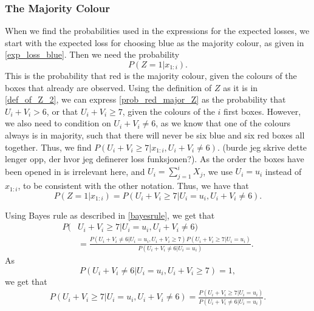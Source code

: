 \subsubsection{The Majority Colour}
When we find the probabilities used in the expressions for the expected losses, we start with the expected loss for choosing blue as the majority colour, as given in \eqref{exp_loss_blue}. Then we need the probability
\begin{equation}
\label{prob_red_major_Z}
    P(Z=1|x_{1:i}).
\end{equation}
This is the probability that red is the majority colour, given the colours of the boxes that already are observed. Using the definition of $Z$ as it is in \eqref{def_of_Z_2}, we can express \eqref{prob_red_major_Z} as the probability that $U_i+V_i>6$, or that $U_i+V_i \geq 7$, given the colours of the $i$ first boxes. However, we also need to condition on $U_i+V_i \neq 6$, as we know that one of the colours always is in majority, such that there will never be six blue and six red boxes all together. Thus, we find $P(U_i+V_i \geq 7 | x_{1:i},U_i+V_i \neq 6)$. (burde jeg skrive dette lenger opp, der hvor jeg definerer loss funksjonen?).  As the order the boxes have been opened in is irrelevant here, and $U_i = \sum_{j=1}^i X_j$, we use $U_i=u_i$ instead of $x_{1:i}$, to be consistent with the other notation. Thus, we have that
\begin{equation}
\label{Z_to_U_and_V}
    P(Z=1|x_{1:i}) = P(U_i+V_i \geq 7 | U_i=u_i,U_i+V_i \neq 6).
\end{equation}

Using Bayes rule as described in \eqref{bayesrule}, we get that
\begin{equation}
\label{redmajor2}
    \begin{aligned}
        P(&U_i+V_i \geq 7 | U_i=u_i,U_i+V_i \neq 6) \\[6pt]
        &= \frac{P(U_i+V_i\neq6|U_i=u_i,U_i+V_i\geq7)P(U_i+V_i\geq7|U_i=u_i)}{P(U_i+V_i\neq6|U_i=u_i)}.
    \end{aligned}
\end{equation}
As 
\begin{equation*}
    P(U_i+V_i\neq6|U_i=u_i,U_i+V_i\geq7) = 1,
\end{equation*}
we get that
\begin{equation}
\label{redmajor3}
    \begin{aligned}
        P(U_i+V_i \geq 7 | U_i=u_i,U_i+V_i \neq 6)
        = \frac{P(U_i+V_i\geq7|U_i=u_i)}{P(U_i+V_i\neq6|U_i=u_i)}.
    \end{aligned}
\end{equation}


